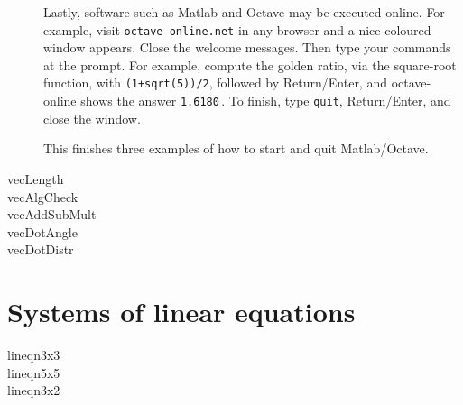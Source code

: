 \documentclass[12pt,a5paper,smallborder,twoside]{refrep}
\begin{document}
\begin{description}
Lastly, software such as Matlab and Octave may be executed online.
For example, visit \verb|octave-online.net| in any browser and a nice coloured window appears.
Close the welcome messages.
Then type your commands at the prompt.
For example, compute the golden ratio, via the square-root function, with \verb|(1+sqrt(5))/2|, followed by Return\slash Enter, and octave-online shows the answer \verb|1.6180|\,.
To finish, type \verb|quit|, Return\slash Enter, and close the window.

This finishes three examples of how to start and quit Matlab/Octave.


\item[vecLength]


\item[vecAlgCheck]


\item[vecAddSubMult]


\item[vecDotAngle]


\item[vecDotDistr]

\end{description}


\chapter{Systems of linear equations}

\begin{description}

\item[lineqn3x3]


\item[lineqn5x5]


\item[lineqn3x2]


\end{description}
\end{document}
